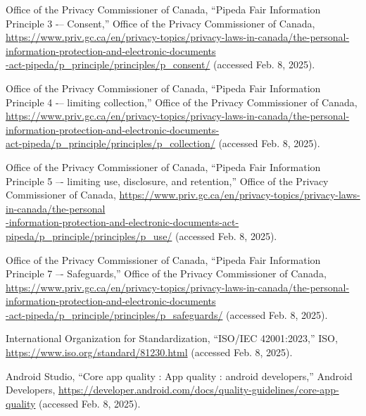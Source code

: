 \documentclass[]{article}
\begin{document}
\begin{thebibliography}{99}
     Office of the Privacy Commissioner of Canada, “Pipeda Fair Information Principle 3 -– Consent,” Office of the Privacy Commissioner of Canada,  
    \url{https://www.priv.gc.ca/en/privacy-topics/privacy-laws-in-canada/the-personal-information-protection-and-electronic-documents}\\
    \url{-act-pipeda/p_principle/principles/p_consent/} 
    (accessed Feb. 8, 2025). 
    
     Office of the Privacy Commissioner of Canada, “Pipeda Fair Information Principle 4 -– limiting collection,” Office of the Privacy Commissioner of Canada,  
    \url{https://www.priv.gc.ca/en/privacy-topics/privacy-laws-in-canada/the-personal-information-protection-and-electronic-documents-}\\
    \url{act-pipeda/p_principle/principles/p_collection/} 
    (accessed Feb. 8, 2025). 
    
     Office of the Privacy Commissioner of Canada, “Pipeda Fair Information Principle 5 –- limiting use, disclosure, and retention,” Office of the Privacy Commissioner of Canada,  \url{https://www.priv.gc.ca/en/privacy-topics/privacy-laws-in-canada/the-personal}\\
    \url{-information-protection-and-electronic-documents-act-pipeda/p_principle/principles/p_use/} 
    (accessed Feb. 8, 2025). 
    
     Office of the Privacy Commissioner of Canada, “Pipeda Fair Information Principle 7 –- Safeguards,” Office of the Privacy Commissioner of Canada,  
    \url{https://www.priv.gc.ca/en/privacy-topics/privacy-laws-in-canada/the-personal-information-protection-and-electronic-documents}\\
    \url{-act-pipeda/p_principle/principles/p_safeguards/} 
    (accessed Feb. 8, 2025). 
    
     International Organization for Standardization, “ISO/IEC 42001:2023,” ISO,  
    \url{https://www.iso.org/standard/81230.html} 
    (accessed Feb. 8, 2025). 
    
     Android Studio, “Core app quality  :  App quality  :  android developers,” Android Developers,  
    \url{https://developer.android.com/docs/quality-guidelines/core-app-quality} 
    (accessed Feb. 8, 2025). 
\end{thebibliography}
\end{document}
